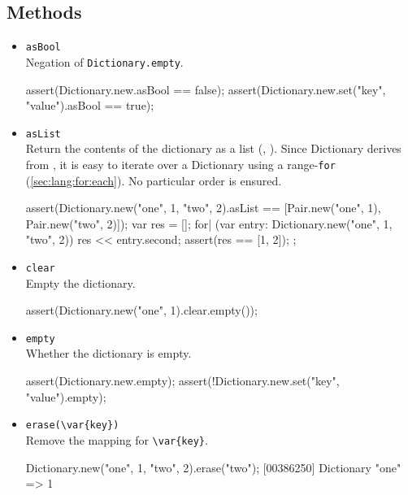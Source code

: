 \subsection{Methods}

\begin{itemize}
\item \lstinline|asBool|\\
  Negation of \lstinline|Dictionary.empty|.
\begin{urbiscript}[firstnumber=last]
assert(Dictionary.new.asBool == false);
assert(Dictionary.new.set("key", "value").asBool == true);
\end{urbiscript}

\item \lstinline|asList|\\
  Return the contents of the dictionary as a  list
  (, ).  Since Dictionary derives from
  , it is easy to iterate over a Dictionary
  using a range-\lstinline|for| (\autoref{sec:lang:for:each}).  No
  particular order is ensured.

\begin{urbiscript}[firstnumber=last]
assert(Dictionary.new("one", 1, "two", 2).asList
       == [Pair.new("one", 1), Pair.new("two", 2)]);
{
  var res = [];
  for| (var entry: Dictionary.new("one", 1, "two", 2))
    res << entry.second;
  assert(res == [1, 2]);
};
\end{urbiscript}

\item \lstinline|clear|\\
  Empty the dictionary.

\begin{urbiscript}[firstnumber=last]
assert(Dictionary.new("one", 1).clear.empty());
\end{urbiscript}

\item \lstinline|empty|\\
  Whether the dictionary is empty.

\begin{urbiscript}[firstnumber=last]
assert(Dictionary.new.empty);
assert(!Dictionary.new.set("key", "value").empty);
\end{urbiscript}

\item \lstinline|erase(\var{key})|\\
  Remove the mapping for \lstinline|\var{key}|.

\begin{urbiscript}[firstnumber=last]
Dictionary.new("one", 1, "two", 2).erase("two");
[00386250] Dictionary {"one" => 1}
\end{urbiscript}


\end{itemize}

